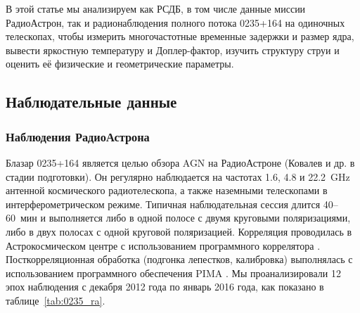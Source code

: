 В этой статье мы анализируем как РСДБ, в том числе данные миссии РадиоАстрон, так и радионаблюдения
полного потока 0235+164 на одиночных телескопах, чтобы измерить многочастотные временные задержки и
размер ядра, вывести яркостную температуру и Доплер-фактор, изучить структуру струи и оценить её
физические и геометрические параметры.

\subsection{Наблюдательные данные}

\subsubsection{Наблюдения РадиоАстрона}

Блазар 0235+164 является целью обзора AGN на РадиоАстроне (Ковалев и др. в стадии подготовки). Он
регулярно наблюдается на частотах 1.6, 4.8 и \SI{22.2}{\GHz} антенной космического радиотелескопа, а
также наземными телескопами в интерферометрическом режиме. Типичная наблюдательная сессия длится
40--60~мин и выполняется либо в одной полосе с двумя круговыми поляризациями, либо в двух полосах с
одной круговой поляризацией. Корреляция проводилась в Астрокосмическом центре с использованием
программного коррелятора \cite{Kardashev_2013_rus,Likhachev_2017}. Посткорреляционная обработка
(подгонка лепестков, калибровка) выполнялась с использованием программного обеспечения PIMA
\cite{Petrov_2011}. Мы проанализировали 12 эпох наблюдения с декабря 2012 года по январь 2016 года,
как показано в таблице~\ref{tab:0235_ra}.

